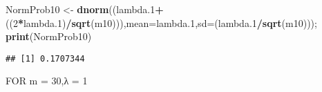 \documentclass[
]{article}
\newenvironment{Shaded}{\begin{snugshade}}{\end{snugshade}}
\newcommand{\DataTypeTok}[1]{\textcolor[rgb]{0.13,0.29,0.53}{#1}}
\newcommand{\DecValTok}[1]{\textcolor[rgb]{0.00,0.00,0.81}{#1}}
\newcommand{\FloatTok}[1]{\textcolor[rgb]{0.00,0.00,0.81}{#1}}
\newcommand{\KeywordTok}[1]{\textcolor[rgb]{0.13,0.29,0.53}{\textbf{#1}}}
\newcommand{\NormalTok}[1]{#1}
\newcommand{\OperatorTok}[1]{\textcolor[rgb]{0.81,0.36,0.00}{\textbf{#1}}}
\newcommand{\StringTok}[1]{\textcolor[rgb]{0.31,0.60,0.02}{#1}}
\begin{document}
\begin{Shaded}
\begin{Highlighting}[]
\NormalTok{NormProb10 <-}\StringTok{ }\KeywordTok{dnorm}\NormalTok{((lambda}\FloatTok{.1}\OperatorTok{+}\NormalTok{((}\DecValTok{2}\OperatorTok{*}\NormalTok{lambda}\FloatTok{.1}\NormalTok{)}\OperatorTok{/}\KeywordTok{sqrt}\NormalTok{(m10))),}\DataTypeTok{mean=}\NormalTok{lambda}\FloatTok{.1}\NormalTok{,}\DataTypeTok{sd=}\NormalTok{(lambda}\FloatTok{.1}\OperatorTok{/}\KeywordTok{sqrt}\NormalTok{(m10))); }\KeywordTok{print}\NormalTok{(NormProb10)}
\end{Highlighting}
\end{Shaded}

\begin{verbatim}
## [1] 0.1707344
\end{verbatim}

FOR m = 30,λ = 1
\end{document}

